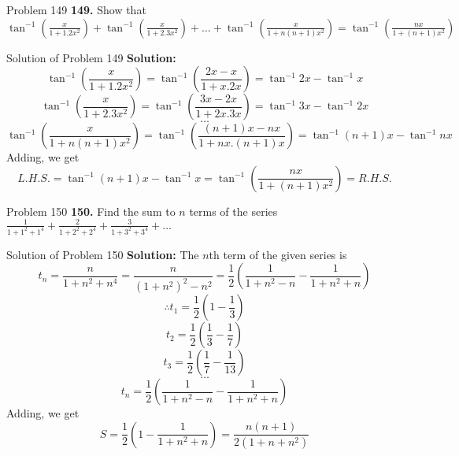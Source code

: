 \documentclass[aspectratio=1610,8pt]{beamer}
\begin{document}
\begin{frame}{Problem 149}
  \textbf{149.} Show that $\tan^{-1}\left(\frac{x}{1 + 1.2x^2}\right) + \tan^{-1}\left(\frac{x}{1 + 2.3x^2}\right) + \ldots+
  \tan^{-1}\left(\frac{x}{1 + n(n + 1)x^2}\right) = \tan^{-1}\left(\frac{nx}{1 + (n + 1)x^2}\right)$
\end{frame}
\begin{frame}{Solution of Problem 149}
  \textbf{Solution:} $$\tan^{-1}\left(\frac{x}{1 + 1.2x^2}\right) = \tan^{-1}\left(\frac{2x - x}{1 + x. 2x}\right) = \tan^{-1}2x -
  \tan^{-1}x$$
  $$\tan^{-1}\left(\frac{x}{1 + 2.3x^2}\right) = \tan^{-1}\left(\frac{3x - 2x}{1 + 2x.3x}\right) = \tan^{-1}3x - \tan^{-1}2x$$
  $$\ldots$$
  $$\tan^{-1}\left(\frac{x}{1 + n(n + 1)x^2}\right) = \tan^{-1}\left(\frac{(n + 1)x - nx}{1 + nx.(n + 1)x}\right) = \tan^{-1}(n +
  1)x - \tan^{-1}nx$$
  Adding, we get
  $$L.H.S. = \tan^{-1}(n + 1)x - \tan^{-1}x = \tan^{-1}\left(\frac{nx}{1 + (n + 1)x^2}\right) = R.H.S.$$
\end{frame}
\begin{frame}{Problem 150}
  \textbf{150.} Find the sum to $n$ terms of the series $\frac{1}{1 + 1^2 + 1^4} + \frac{2}{1 + 2^2 + 2^4} + \frac{3}{1 + 3^2 +
    3^4} + \ldots$
\end{frame}
\begin{frame}{Solution of Problem 150}
  \textbf{Solution:} The $n$th term of the given series is
  $$t_n = \frac{n}{1 + n^2 + n^4} = \frac{n}{(1 + n^2)^2 - n^2} = \frac{1}{2}\left(\frac{1}{1 + n^2 - n} - \frac{1}{1 + n^2 +
    n}\right)$$
  $$\therefore t_1 = \frac{1}{2}\left(1 - \frac{1}{3}\right)$$
  $$t_2 = \frac{1}{2}\left(\frac{1}{3} - \frac{1}{7}\right)$$
  $$t_3 = \frac{1}{2}\left(\frac{1}{7} - \frac{1}{13}\right)$$
  $$\ldots$$
  $$t_n = \frac{1}{2}\left(\frac{1}{1 + n^2 - n} - \frac{1}{1 + n^2 + n}\right)$$
  Adding, we get
  $$S= \frac{1}{2}\left(1 - \frac{1}{1 + n^2 + n}\right) = \frac{n(n + 1)}{2(1 + n + n^2)}$$
\end{frame}
\end{document}
